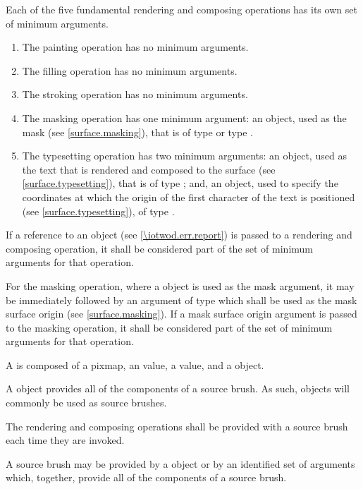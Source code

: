 \pnum
Each of the five fundamental rendering and composing operations has its own set of minimum arguments.
\begin{enumerate}
	\item The painting operation has no minimum arguments.
	\item The filling operation has no minimum arguments.
	\item The stroking operation has no minimum arguments.
	\item The masking operation has one minimum argument: an object, used as the mask (see \ref{surface.masking}), that is of type  or type .
	\item The typesetting operation has two minimum arguments: an object, used as the text that is rendered and composed to the surface (see \ref{surface.typesetting}), that is of type ; and, an object, used to specify the coordinates at which the origin of the first character of the text is positioned (see \ref{surface.typesetting}), of type .
\end{enumerate}

\pnum
If a reference to an  object (see \ref{\iotwod.err.report}) is passed to a rendering and composing operation, it shall be considered part of the set of minimum arguments for that operation.

\pnum
For the masking operation, where a  object is used as the mask argument, it may be immediately followed by an argument of type  which shall be used as the mask surface origin (see \ref{surface.masking}). If a mask surface origin argument is passed to the masking operation, it shall be considered part of the set of minimum arguments for that operation.

\pnum
A  is composed of a pixmap, an  value, a  value, and a  object.

\pnum
\enternote
A  object provides all of the components of a source brush. As such,  objects will commonly be used as source brushes.
\exitnote

\pnum
The rendering and composing operations shall be provided with a source brush each time they are invoked.

\pnum
A source brush may be provided by a  object or by an identified set of arguments which, together, provide all of the components of a source brush.

